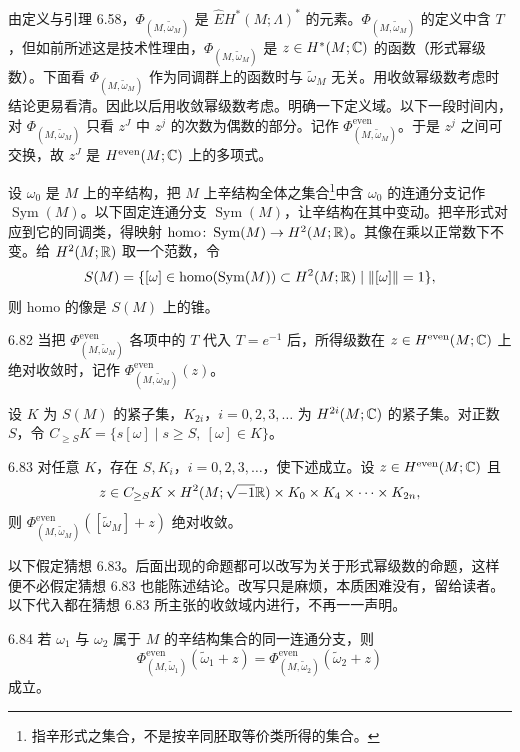 由定义与引理 6.58，$\Phi_{(M,\tilde\omega_M)}$ 是 $\widehat{E}H^*(M;\Lambda)^*$ 的元素。$\Phi_{(M,\tilde\omega_M)}$ 的定义中含 $T$，但如前所述这是技术性理由，$\Phi_{(M,\tilde\omega_M)}$ 是 $z\in H^*(M;\mathbb{C})$ 的函数（形式幂级数）。下面看 $\Phi_{(M,\tilde\omega_M)}$ 作为同调群上的函数时与 $\tilde\omega_M$ 无关。用收敛幂级数考虑时结论更易看清。因此以后用收敛幂级数考虑。明确一下定义域。以下一段时间内，对 $\Phi_{(M,\tilde\omega_M)}$ 只看 $z^J$ 中 $z^j$ 的次数为偶数的部分。记作 $\Phi^{\mathrm{even}}_{(M,\tilde\omega_M)}$。于是 $z^j$ 之间可交换，故 $z^J$ 是 $H^{\mathrm{even}}(M;\mathbb{C})$ 上的多项式。

设 $\omega_0$ 是 $M$ 上的辛结构，把 $M$ 上辛结构全体之集合\footnote{指辛形式之集合，不是按辛同胚取等价类所得的集合。}中含 $\omega_0$ 的连通分支记作 $\operatorname{Sym}(M)$。以下固定连通分支 $\operatorname{Sym}(M)$，让辛结构在其中变动。把辛形式对应到它的同调类，得映射 $\mathrm{homo}\colon\operatorname{Sym}(M)\to H^2(M;\mathbb{R})$。其像在乘以正常数下不变。给 $H^2(M;\mathbb{R})$ 取一个范数，令
\[
  S(M)=\{[\omega]\in\mathrm{homo}(\operatorname{Sym}(M))\subset H^2(M;\mathbb{R})\mid\|[\omega]\|=1\},
\]
则 $\mathrm{homo}$ 的像是 $S(M)$ 上的锥。

\begin{definition}{6.82}
  当把 $\Phi^{\mathrm{even}}_{(M,\tilde\omega_M)}$ 各项中的 $T$ 代入 $T=e^{-1}$ 后，所得级数在 $z\in H^{\mathrm{even}}(M;\mathbb{C})$ 上绝对收敛时，记作 $\Phi^{\mathrm{even}}_{(M,\tilde\omega_M)}(z)$。
\end{definition}

设 $K$ 为 $S(M)$ 的紧子集，$K_{2i}$，$i=0,2,3,\dots$ 为 $H^{2i}(M;\mathbb{C})$ 的紧子集。对正数 $S$，令 $C_{\ge S}K=\{s[\omega]\mid s\ge S,\ [\omega]\in K\}$。

\begin{conjecture}{6.83}
  对任意 $K$，存在 $S,K_i$，$i=0,2,3,\dots$，使下述成立。设 $z\in H^{\mathrm{even}}(M;\mathbb{C})$ 且
  \[
    z\in C_{\ge S}K\times H^2(M;\sqrt{-1}\mathbb{R})\times K_0\times K_4\times\cdots\times K_{2n},
  \]
  则 $\Phi^{\mathrm{even}}_{(M,\tilde\omega_M)}([\tilde\omega_M]+z)$ 绝对收敛。
\end{conjecture}

以下假定猜想 6.83。后面出现的命题都可以改写为关于形式幂级数的命题，这样便不必假定猜想 6.83 也能陈述结论。改写只是麻烦，本质困难没有，留给读者。以下代入都在猜想 6.83 所主张的收敛域内进行，不再一一声明。

\begin{proposition}{6.84}
  若 $\omega_1$ 与 $\omega_2$ 属于 $M$ 的辛结构集合的同一连通分支，则
  \[
    \Phi^{\mathrm{even}}_{(M,\tilde\omega_1)}(\tilde\omega_1+z)
    =\Phi^{\mathrm{even}}_{(M,\tilde\omega_2)}(\tilde\omega_2+z)
  \]
  成立。
\end{proposition}

